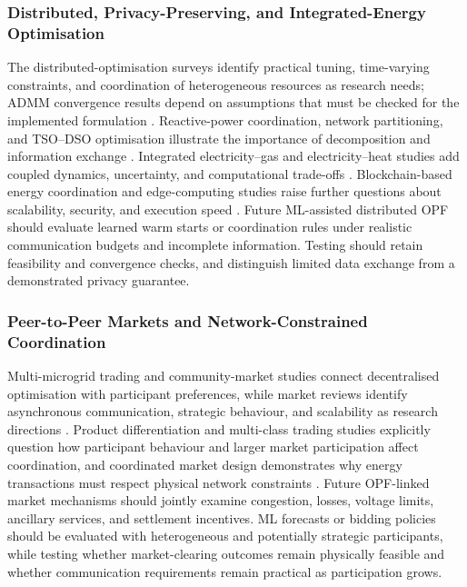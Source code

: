\documentclass[a4paper,fleqn]{cas-sc}
\begin{document}
\subsubsection{Distributed, Privacy-Preserving, and Integrated-Energy Optimisation}\label{subsubsec:gaps_distributed}

The distributed-optimisation surveys identify practical tuning, time-varying constraints, and coordination of heterogeneous resources as research needs; ADMM convergence results depend on assumptions that must be checked for the implemented formulation \cite{opfRef001,opfRef050,opfRef044}. Reactive-power coordination, network partitioning, and TSO--DSO optimisation illustrate the importance of decomposition and information exchange \cite{opfRef025,opfRef046,opfRef043}. Integrated electricity--gas and electricity--heat studies add coupled dynamics, uncertainty, and computational trade-offs \cite{opfRef039,opfRef042,opfRef086}. Blockchain-based energy coordination and edge-computing studies raise further questions about scalability, security, and execution speed \cite{opfRef033,opfRef054,opfRef065,opfRef081}. Future ML-assisted distributed OPF should evaluate learned warm starts or coordination rules under realistic communication budgets and incomplete information. Testing should retain feasibility and convergence checks, and distinguish limited data exchange from a demonstrated privacy guarantee.

\subsubsection{Peer-to-Peer Markets and Network-Constrained Coordination}\label{subsubsec:gaps_markets}

Multi-microgrid trading and community-market studies connect decentralised optimisation with participant preferences, while market reviews identify asynchronous communication, strategic behaviour, and scalability as research directions \cite{opfRef024,sousa2019peer,opfRef087}. Product differentiation and multi-class trading studies explicitly question how participant behaviour and larger market participation affect coordination, and coordinated market design demonstrates why energy transactions must respect physical network constraints \cite{opfRef052,opfRef058,opfRef066}. Future OPF-linked market mechanisms should jointly examine congestion, losses, voltage limits, ancillary services, and settlement incentives. ML forecasts or bidding policies should be evaluated with heterogeneous and potentially strategic participants, while testing whether market-clearing outcomes remain physically feasible and whether communication requirements remain practical as participation grows.
\end{document}
